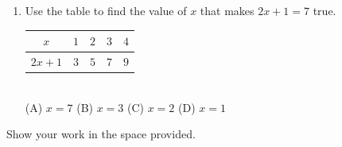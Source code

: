 \begin{enumerate}[leftmargin=1.9em, itemsep=12pt]
  \item Use the table to find the value of $x$ that makes $2x + 1 = 7$ true.
    \quad
    \renewcommand{\arraystretch}{1.2}
    \begin{tabular}{|c|c|c|c|c|}
    \hline
    $x$      & $1$ & $2$ & $3$ & $4$ \\ \hline
    $2x + 1$ & $3$ & $5$ & $7$ & $9$ \\ \hline
    \end{tabular}
    \\[4pt]\hspace*{1em}
    (A) $x = 7$ \quad (B) $x = 3$ \quad (C) $x = 2$ \quad (D) $x = 1$
    \hfill {}\gradedblank[id=a8, type=choice, points=1, answer=B]{1.1cm}{13pt}\vphantom{\blank{0pt}}

\end{enumerate}

\boxguard[20]
Show your work in the space provided.

